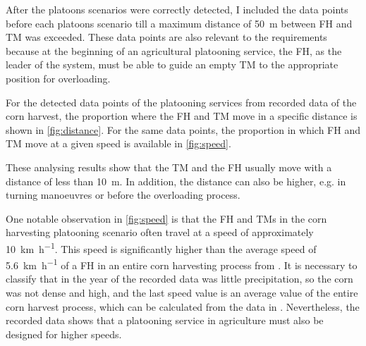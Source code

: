 After the platoons scenarios were correctly detected, I included the data points before each platoons scenario till a maximum distance of \SI{50}{\metre} between \ac{FH} and \ac{TM} was exceeded. These data points are also relevant to the requirements because at the beginning of an agricultural platooning service, the \ac{FH}, as the leader of the system, must be able to guide an empty \ac{TM} to the appropriate position for overloading.

For the detected data points of the platooning services from recorded data of the corn harvest, the proportion where the \ac{FH} and \ac{TM} move in a specific distance is shown in \autoref{fig:distance}. For the same data points, the proportion in which \ac{FH} and \ac{TM} move at a given speed is available in \autoref{fig:speed}.

These analysing results show that the \ac{TM} and the \ac{FH} usually move with a distance of less than \SI{10}{\metre}. In addition, the distance can also be higher, e.g. in turning manoeuvres or before the overloading process.

One notable observation in \autoref{fig:speed} is that the \ac{FH} and \ac{TM}s in the corn harvesting platooning scenario often travel at a speed of approximately \SI{10}{\kilo\metre\per\hour}. This speed is significantly higher than the average speed of \SI{5.6}{\kilo\metre\per\hour} of a \ac{FH} in an entire corn harvesting process from \cite{faustzahlen2018}. It is necessary to classify that in the year of the recorded data was little precipitation, so the corn was not dense and high, and the last speed value is an average value of the entire corn harvest process, which can be calculated from the data in \cite{faustzahlen2018}.
Nevertheless, the recorded data shows that a platooning service in agriculture must also be designed for higher speeds. 

